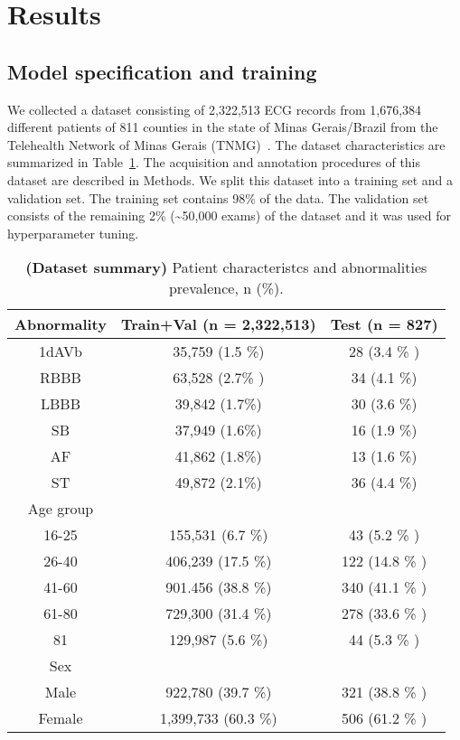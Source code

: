 \documentclass{article}
\begin{document}
\section{Results}

\subsection{Model specification and training}

We collected a dataset consisting of 2,322,513 ECG records from 1,676,384 different patients of 811 counties in the state of Minas Gerais/Brazil from the  Telehealth Network of Minas Gerais (TNMG)~\cite{alkmim_improving_2012}. The dataset characteristics are summarized in Table~\ref{tab:diagnosis}. The acquisition and annotation procedures of this dataset are described in Methods. We split this dataset into a training set and a validation set. The training set contains 98\% of the data. The validation set consists of the remaining 2\% (\textasciitilde 50,000 exams) of the dataset and it was used for hyperparameter tuning. 

\begin{table}[h]
  \centering
  \begin{tabular}{ccc}
    \hline
    \rowcolor[gray]{0.9} Abnormality & Train+Val (n = 2,322,513) & Test (n = 827)\\
    \hline
    1dAVb  &   35,759  (1.5 \%) &  28 (3.4 \% )\\
    RBBB &  63,528 (2.7\% ) &  34 (4.1 \%)\\
    LBBB & 39,842  (1.7\%) &  30 (3.6 \%)\\
    SB & 37,949 (1.6\%) & 16 (1.9 \%)\\
    AF &  41,862 (1.8\%) &  13 (1.6 \%)\\
    ST & 49,872 (2.1\%) &  36 (4.4 \%) \\
    \hline
    \rowcolor[gray]{0.9} Age group & & \\
    16-25 & 155,531  (6.7 \%) &  43 (5.2 \% )\\
    26-40 & 406,239  (17.5 \%)  &  122 (14.8 \% )\\
    41-60 & 901.456  (38.8 \%) &  340 (41.1 \% )\\
    61-80 & 729,300 (31.4 \%) &  278 (33.6 \% )\\
    81 &  129,987 (5.6 \%) &  44 (5.3 \% )\\
    \hline
    \rowcolor[gray]{0.9} Sex & & \\
    Male & 922,780  (39.7 \%) &  321 (38.8 \% )\\
    Female &  1,399,733  (60.3 \%) &  506 (61.2 \% ) \\
    \hline
    \hline
    \end{tabular}
  \caption{\textbf{(Dataset summary)} Patient characteristcs and abnormalities prevalence, n (\%).}
  \label{tab:diagnosis}
\end{table}
\end{document}
